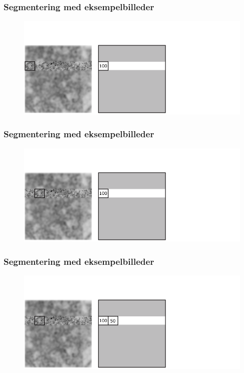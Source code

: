 \documentclass[12pt,t]{beamer}
\begin{document}
\begin{frame}
\frametitle{Segmentering med eksempelbilleder}
\begin{figure}[H]
\includegraphics[scale=0.35]{img/afstand/10.png}
\end{figure}
\end{frame}

\begin{frame}
\frametitle{Segmentering med eksempelbilleder}
\begin{figure}[H]
\includegraphics[scale=0.35]{img/afstand/11.png}
\end{figure}
\end{frame}

\begin{frame}
\frametitle{Segmentering med eksempelbilleder}
\begin{figure}[H]
\includegraphics[scale=0.35]{img/afstand/12.png}
\end{figure}
\end{frame}
\end{document}
